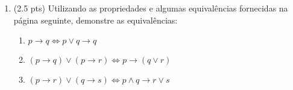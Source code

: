 \documentclass[12pt]{article}
\begin{document}
\begin{enumerate}
\begin{enumerate}
\end{enumerate}


\item (2.5 pts) Utilizando as propriedades e algumas equivalências
fornecidas na página seguinte, demonstre as equivalências:

\begin{enumerate}
\setlength{\itemsep}{-2pt}

\item $p \rightarrow q \Leftrightarrow p \vee q \rightarrow  q$ %

\item  $(p \rightarrow q) \vee (p \rightarrow r) \Leftrightarrow p  \rightarrow  (q \vee r) $ %





\item $(p \rightarrow r)  \vee (q \rightarrow s) \Leftrightarrow p \wedge q \rightarrow  r \vee s $  %




\end{enumerate}


\newpage


\end{enumerate}
\end{document}
